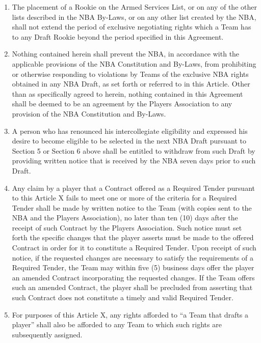 \documentclass[
]{book}
\providecommand{\tightlist}{%
  \setlength{\itemsep}{0pt}\setlength{\parskip}{0pt}}
\begin{document}
\begin{enumerate}
\def\labelenumi{(\alph{enumi})}
\tightlist
\item
  The placement of a Rookie on the Armed Services List, or on any of the other lists described in the NBA By-Laws, or on any other list created by the NBA, shall not extend the period of exclusive negotiating rights which a Team has to any Draft Rookie beyond the period specified in this Agreement.
\item
  Nothing contained herein shall prevent the NBA, in accordance with the applicable provisions of the NBA Constitution and By-Laws, from prohibiting or otherwise responding to violations by Teams of the exclusive NBA rights obtained in any NBA Draft, as set forth or referred to in this Article. Other than as specifically agreed to herein, nothing contained in this Agreement shall be deemed to be an agreement by the Players Association to any provision of the NBA Constitution and By-Laws.
\item
  A person who has renounced his intercollegiate eligibility and expressed his desire to become eligible to be selected in the next NBA Draft pursuant to Section 5 or Section 6 above shall be entitled to withdraw from such Draft by providing written notice that is received by the NBA seven days prior to such Draft.
\item
  Any claim by a player that a Contract offered as a Required Tender pursuant to this Article X fails to meet one or more of the criteria for a Required Tender shall be made by written notice to the Team (with copies sent to the NBA and the Players Association), no later than ten (10) days after the receipt of such Contract by the Players Association. Such notice must set forth the specific changes that the player asserts must be made to the offered Contract in order for it to constitute a Required Tender. Upon receipt of such notice, if the requested changes are necessary to satisfy the requirements of a Required Tender, the Team may within five (5) business days offer the player an amended Contract incorporating the requested changes. If the Team offers such an amended Contract, the player shall be precluded from asserting that such Contract does not constitute a timely
  and valid Required Tender.
\item
  For purposes of this Article X, any rights afforded to ``a Team that drafts a player'' shall also be afforded to any Team to which such rights are subsequently assigned.
\end{enumerate}
\end{document}

